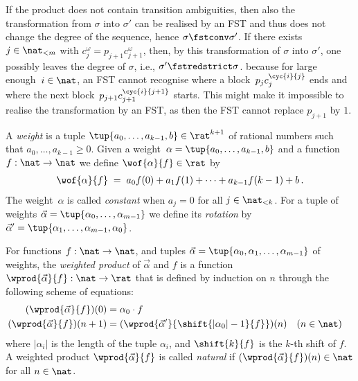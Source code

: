 If the product does not contain transition ambiguities, 
then also the transformation from $\sigma$ into $\sigma'$ 
can be realised by an FST and thus does not change the degree of the sequence, 
hence $\sigma \fstconv \sigma'$.
If there exists $j \in \nat_{<m}$ with
$c_j^\omega = p_{j+1}c_{j+1}^\omega$,
then, by this transformation of $\sigma$ into $\sigma'$, 
one possibly leaves the degree of $\sigma$,
i.e., $\sigma' \fstredstrict \sigma$.
because for large enough~$i\in\nat$, 
an FST cannot recognise where a block~$p_j c_j^{\cyc{i}{j}}$ ends 
and where the next block~$p_{j+1} c_{j+1}^{\cyc{i}{j+1}}$ starts.
This might make it impossible to realise the transformation by an FST,
as then the FST cannot replace $p_{j+1}$ by $1$.


\begin{definition}\label{def:weighted:product}
  A \emph{weight} is a tuple $\tup{a_0,\ldots,a_{k-1},b} \in \rat^{k+1}$ 
  of rational numbers
  such that $a_0,\ldots,a_{k-1} \ge 0$. Given a weight~$\alpha = \tup{a_0,\ldots,a_{k-1},b}$ and a function $f : \nat \to \nat$
  we define
  $\wof{\alpha}{f} \in \rat$ by
  \begin{align*}
    \wof{\alpha}{f} \;=\; a_0 f(0) + a_1 f(1) + \cdots + a_{k-1} f(k-1) + b \,.
  \end{align*}
  The weight~$\alpha$ is called \emph{constant} when $a_j = 0$ for all $j \in \nat_{<k}$.
  For a tuple of weights $\vec{\alpha} = \tup{\alpha_0,\ldots,\alpha_{m-1}}$ 
  we define its \emph{rotation} by $\vec{\alpha}' = \tup{\alpha_1,\ldots ,\alpha_{m-1},\alpha_0}$.
  


  For functions $f : \nat \to \nat$,
  and tuples $\vec{\alpha} = \tup{\alpha_0,\alpha_1,\ldots, \alpha_{m-1}}$ of weights,
  the \emph{weighted product} of $\vec{\alpha}$ and $f$ is a function $\wprod{\vec{\alpha}}{f} : \nat \to \rat$
  that is defined by induction on $n$ through the following scheme of equations: 
  \begin{align*}
    (\wprod{\vec{\alpha}}{f})(0) & = \alpha_0 \cdot f \\
    (\wprod{\vec{\alpha}}{f})(n+1) & = (\wprod{\vec{\alpha}'}{\shift{|\alpha_0|-1}{f}})(n) && (n \in \nat)
  \end{align*}
  where $|\alpha_i|$ is the length of the tuple $\alpha_i$,
  and $\shift{k}{f} $ is the $k$-th shift of $f$.
A weighted product $\wprod{\vec{\alpha}}{f}$ is called \emph{natural} 
  if $(\wprod{\vec{\alpha}}{f})(n) \in \nat$ for all $n \in \nat$. 
\end{definition}

